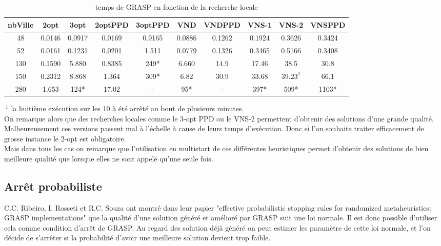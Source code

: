 \documentclass[12pt,a4paper]{article}
\begin{document}
\begin{table}[!h]
\centering
\begin{tabular}{|*{10}{c|}}
  \hline
  nbVille & 2opt & 3opt & 2optPPD & 3optPPD & VND & VNDPPD & VNS-1 & VNS-2 & VNSPPD \\
  \hline
  48 & 0.0146 & 0.0917 & 0.0169 & 0.9165 & 0.0886 & 0.1262 & 0.1924 & 0.3626 & 0.3424 \\ 
  52 & 0.0161 & 0.1231 & 0.0201 & 1.511 & 0.0779 & 0.1326 & 0.3465 & 0.5166 & 0.3408 \\
  130 & 0.1590 & 5.880 & 0.8385 & 249* & 6.660 & 14.9 & 17.46 & 38.5 & 30.8 \\
  150 & 0.2312 & 8.868 & 1.364 & 309* & 6.82 & 30.9 & 33.68 & $39.23^1$ & 66.1 \\  
  280 & 1.653 & 124* & 17.02 & - & 95* & - & 397* & 509* & 1103* \\
  \hline
\end{tabular}
\caption{temps de GRASP en fonction de la recherche locale}
\label{recherchelocaleGRASPtemps}
\end{table}
$~^1$ la huitième exécution sur les 10 à été arrêté au bout de plusieurs minutes.\\

On remarque alors que des recherches locales comme le 3-opt PPD ou le VNS-2 permettent d'obtenir des solutions d'une grande qualité. Malheureusement ces versions passent mal à l’échelle à cause de leurs temps d’exécution. Donc si l'on souhaite traiter efficacement de grosse instance le 2-opt est obligatoire.\\

Mais dans tous les cas on remarque que l'utilisation en multistart de ces différentes heuristiques permet d'obtenir des solutions de bien meilleure qualité que lorsque elles ne sont appelé qu'une seule fois.\\

\subsection{Arrêt probabiliste}

C.C. Ribeiro, I. Rosseti et R.C. Souza ont montré dans leur papier "effective probabilistic stopping rules for randomized metaheuristics: GRASP implementations" que la qualité d'une solution généré et amélioré par GRASP suit une loi normale. Il est donc possible d'utiliser cela comme condition d’arrêt de GRASP. Au regard des solution déjà généré on peut estimer les paramètre de cette loi normale, et l'on décide de s’arrêter si la probabilité d'avoir une meilleure solution devient trop faible.\\
\end{document}
